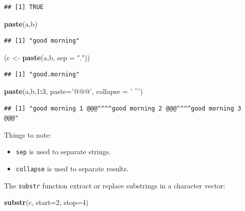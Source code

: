 \documentclass[]{book}
\newenvironment{Shaded}{\begin{snugshade}}{\end{snugshade}}
\newcommand{\KeywordTok}[1]{\textcolor[rgb]{0.13,0.29,0.53}{\textbf{#1}}}
\newcommand{\DataTypeTok}[1]{\textcolor[rgb]{0.13,0.29,0.53}{#1}}
\newcommand{\DecValTok}[1]{\textcolor[rgb]{0.00,0.00,0.81}{#1}}
\newcommand{\StringTok}[1]{\textcolor[rgb]{0.31,0.60,0.02}{#1}}
\newcommand{\OperatorTok}[1]{\textcolor[rgb]{0.81,0.36,0.00}{\textbf{#1}}}
\newcommand{\NormalTok}[1]{#1}
\providecommand{\tightlist}{%
  \setlength{\itemsep}{0pt}\setlength{\parskip}{0pt}}
\theoremstyle{definition}
\theoremstyle{definition}
\theoremstyle{definition}
\theoremstyle{remark}
\begin{document}
\begin{verbatim}
## [1] TRUE
\end{verbatim}

\begin{Shaded}
\begin{Highlighting}[]
\KeywordTok{paste}\NormalTok{(a,b)}
\end{Highlighting}
\end{Shaded}

\begin{verbatim}
## [1] "good morning"
\end{verbatim}

\begin{Shaded}
\begin{Highlighting}[]
\NormalTok{(c <-}\StringTok{ }\KeywordTok{paste}\NormalTok{(a,b, }\DataTypeTok{sep =} \StringTok{"."}\NormalTok{))}
\end{Highlighting}
\end{Shaded}

\begin{verbatim}
## [1] "good.morning"
\end{verbatim}

\begin{Shaded}
\begin{Highlighting}[]
\KeywordTok{paste}\NormalTok{(a,b,}\DecValTok{1}\OperatorTok{:}\DecValTok{3}\NormalTok{, }\DataTypeTok{paste=}\StringTok{'@@@'}\NormalTok{, }\DataTypeTok{collapse =} \StringTok{'^^^^'}\NormalTok{)}
\end{Highlighting}
\end{Shaded}

\begin{verbatim}
## [1] "good morning 1 @@@^^^^good morning 2 @@@^^^^good morning 3 @@@"
\end{verbatim}

Things to note:

\begin{itemize}
\tightlist
\item
  \texttt{sep} is used to separate strings.
\item
  \texttt{collapse} is used to separate results.
\end{itemize}

The \texttt{substr} function extract or replace substrings in a
character vector:

\begin{Shaded}
\begin{Highlighting}[]
\KeywordTok{substr}\NormalTok{(c, }\DataTypeTok{start=}\DecValTok{2}\NormalTok{, }\DataTypeTok{stop=}\DecValTok{4}\NormalTok{)}
\end{Highlighting}
\end{Shaded}
\end{document}
